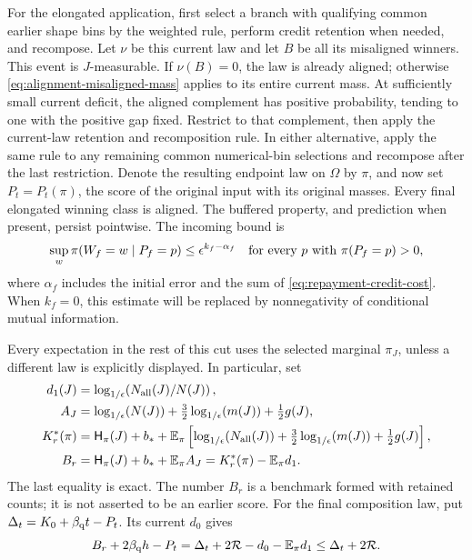 For the elongated application, first select a branch with qualifying
common earlier shape bins by the weighted rule, perform credit
retention when needed, and recompose.  Let \(\nu\) be this current
law and let \(B\) be all its misaligned winners.  This event is
\(J\)-measurable.  If \(\nu(B)=0\), the law is already aligned;
otherwise \eqref{eq:alignment-misaligned-mass} applies to its
entire current mass.  At sufficiently small current deficit,
the aligned complement has positive probability, tending to one
with the positive gap fixed.  Restrict to that complement, then
apply the current-law retention and recomposition rule.
In either alternative, apply the same rule to any remaining common
numerical-bin selections and recompose after the last restriction.  Denote
the resulting endpoint law on \(\Omega\) by \(\pi\), and now set
\(P_t=P_t(\pi)\), the score of the original input with its original masses.
Every final elongated winning class is aligned.
The buffered property, and prediction when present, persist pointwise.
The incoming bound is
\begin{equation}
 \sup_w\pi(W_f=w\mid P_f=p)
 \le \epsilon^{k_f-\alpha_f}
 \quad\text{for every \(p\) with \(\pi(P_f=p)>0\)},
 \label{eq:repayment-selected-credit}
\end{equation}
where \(\alpha_f\) includes the initial error and the sum of
\eqref{eq:repayment-credit-cost}.  When \(k_f=0\), this estimate
will be replaced by nonnegativity of conditional mutual information.

Every expectation in the rest of this cut uses the selected marginal
\(\pi_J\), unless a different law is explicitly displayed.  In
particular, set
\begin{align}
 d_1(J)&=\log_{1/\epsilon}\!\left(N_{\rm all}(J)/N(J)\right),\nonumber\\
 A_J&=\log_{1/\epsilon}\!\left(N(J)\right)+\tfrac32\log_{1/\epsilon}\!\left(m(J)\right)+\tfrac12g(J),\nonumber\\
 K_r^*(\pi)&=\mathsf H_\pi(J)+b_*+
   \mathbb E_\pi\left[\log_{1/\epsilon}\!\left(N_{\rm all}(J)\right)
                  +\tfrac32\log_{1/\epsilon}\!\left(m(J)\right)+\tfrac12g(J)\right],
 \nonumber\\
 B_r&=\mathsf H_\pi(J)+b_*+\mathbb E_\pi A_J
       =K_r^*(\pi)-\mathbb E_\pi d_1 .
 \label{eq:repayment-benchmark}
\end{align}
The last equality is exact.  The number \(B_r\) is a benchmark
formed with retained counts; it is not asserted to be an earlier
score.
For the final composition law, put
\(\Delta_t=K_0+\beta_{\mathrm q} t-P_t\).  Its current \(d_0\) gives
\begin{equation}
 B_r+2\beta_{\mathrm q} h-P_t
 =\Delta_t+2\mathcal R-d_0-\mathbb E_\pi d_1
 \le\Delta_t+2\mathcal R .
 \label{eq:repayment-input-bridge}
\end{equation}

